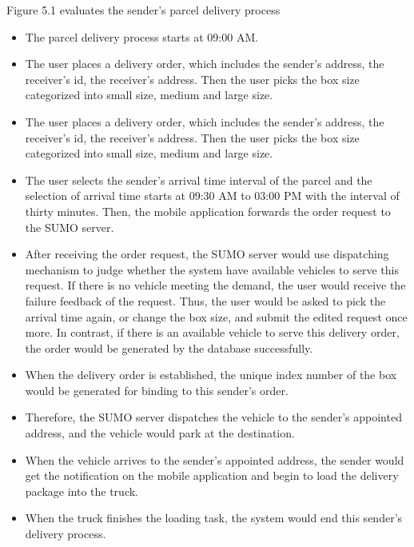\documentclass[12pt]{ksthesis}
\begin{document}
\begin{thesis}
{Figure 5.1 evaluates the sender’s parcel delivery process


\begin{itemize}
\item
The parcel delivery process starts at 09:00 AM.

\item
The user places a delivery order, which includes the sender’s address, the receiver’s id, the receiver’s address. Then the user picks the box size categorized into small size, medium and large size.

\item
The user places a delivery order, which includes the sender’s address, the receiver’s id, the receiver’s address. Then the user picks the box size categorized into small size, medium and large size.

\item
The user selects the sender’s arrival time interval of the parcel and the selection of arrival time starts at 09:30 AM to 03:00 PM with the interval of thirty minutes. Then, the mobile application forwards the order request to the SUMO server.

\item
After receiving the order request, the SUMO server would use dispatching mechanism to judge whether the system have available vehicles to serve this request. If there is no vehicle meeting the demand, the user would receive the failure feedback of the request. Thus, the user would be asked to pick the arrival time again, or change the box size, and submit the edited request once more.
In contrast, if there is an available vehicle to serve this delivery order, the order would be generated by the database successfully.

\item
When the delivery order is established, the unique index number of the box would be generated for binding to this sender’s order.

\item
Therefore, the SUMO server dispatches the vehicle to the sender’s appointed address, and the vehicle would park at the destination.

\item
When the vehicle arrives to the sender’s appointed address, the sender would get the notification on the mobile application and begin to load the delivery package into the truck.

\item
When the truck finishes the loading task, the system would end this sender’s delivery process.


\end{itemize}}
\end{thesis}
\end{document}
